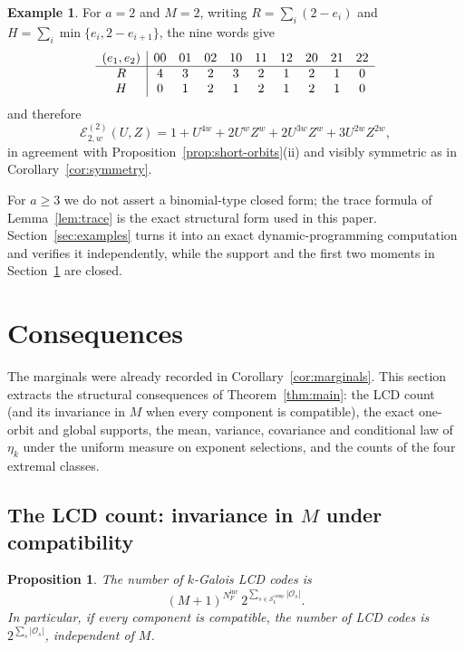 \documentclass[preprint,12pt,a4paper]{elsarticle}
\newcommand{\Os}{\mathcal O_s}
\newcommand{\Epoly}{\mathscr E}
\newtheorem{proposition}[theorem]{Proposition}
\theoremstyle{definition}
\newtheorem{example}[theorem]{Example}
\theoremstyle{remark}
\begin{document}
\begin{example}\label{ex:a2M2}
For $a=2$ and $M=2$, writing $R=\sum_i(2-e_i)$ and
$H=\sum_i\min\{e_i,2-e_{i+1}\}$, the nine words give
\[
\setlength{\tabcolsep}{4pt}
\begin{array}{c|ccccccccc}
(e_1,e_2)&00&01&02&10&11&12&20&21&22\\ \hline
R&4&3&2&3&2&1&2&1&0\\
H&0&1&2&1&2&1&2&1&0
\end{array}
\]
and therefore
\[
\Epoly_{2,w}^{(2)}(U,Z)
 =1+U^{4w}+2U^wZ^w+2U^{3w}Z^w+3U^{2w}Z^{2w},
\]
in agreement with Proposition~\ref{prop:short-orbits}(ii) and visibly symmetric
as in Corollary~\ref{cor:symmetry}.
\end{example}

For $a\geq3$ we do not assert a binomial-type closed form; the trace formula
of Lemma~\ref{lem:trace} is the exact structural form used in this paper.
Section~\ref{sec:examples} turns it into an exact dynamic-programming
computation and verifies it independently, while the support and the first
two moments in Section~\ref{sec:consequences} are closed.

\section{Consequences}\label{sec:consequences}

The marginals were already recorded in Corollary~\ref{cor:marginals}.  This
section extracts the structural consequences of Theorem~\ref{thm:main}: the
LCD count (and its invariance in $M$ when every component is compatible), the exact one-orbit and global supports,
the mean, variance, covariance and conditional law of $\eta_k$ under the
uniform measure on exponent selections, and the counts of the four extremal
classes.

\subsection{The LCD count: invariance in \texorpdfstring{$M$}{M} under compatibility}
\label{sec:lcd}

\begin{proposition}\label{prop:lcd-count}
The number of $k$-Galois LCD codes is
\[
(M+1)^{N_F^{\mathrm{inc}}}\,
2^{\sum_{s\in\mathcal{S}_k^{\mathrm{comp}}}|\Os|}.
\]
In particular, if every component is compatible, the number of LCD codes is
$2^{\sum_s|\Os|}$, independent of $M$.
\end{proposition}
\end{document}
